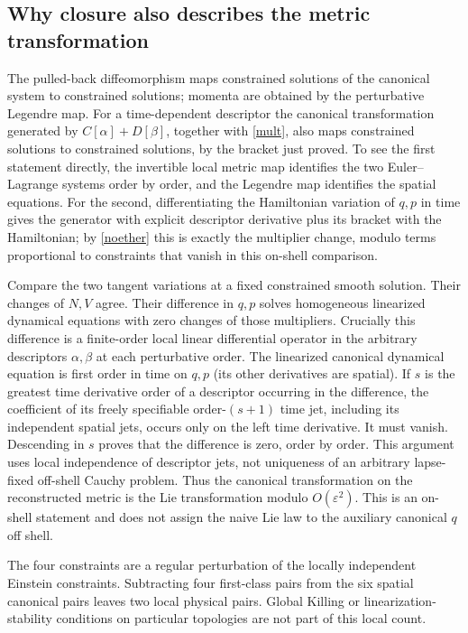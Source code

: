 \documentclass[11pt]{article}
\newcommand{\ep}{\varepsilon}
\begin{document}
\subsection{Why closure also describes the metric transformation}
The pulled-back diffeomorphism maps constrained solutions of the canonical system to constrained solutions; momenta are obtained by the perturbative Legendre map. For a time-dependent descriptor the canonical transformation generated by \(C[\alpha]+D[\beta]\), together with \eqref{mult}, also maps constrained solutions to constrained solutions, by the bracket just proved. To see the first statement directly, the invertible local metric map identifies the two Euler--Lagrange systems order by order, and the Legendre map identifies the spatial equations. For the second, differentiating the Hamiltonian variation of \(q,p\) in time gives the generator with explicit descriptor derivative plus its bracket with the Hamiltonian; by \eqref{noether} this is exactly the multiplier change, modulo terms proportional to constraints that vanish in this on-shell comparison.

Compare the two tangent variations at a fixed constrained smooth solution. Their changes of \(N,V\) agree. Their difference in \(q,p\) solves homogeneous linearized dynamical equations with zero changes of those multipliers. Crucially this difference is a finite-order local linear differential operator in the arbitrary descriptors \(\alpha,\beta\) at each perturbative order. The linearized canonical dynamical equation is first order in time on \(q,p\) (its other derivatives are spatial). If \(s\) is the greatest time derivative order of a descriptor occurring in the difference, the coefficient of its freely specifiable order-\((s+1)\) time jet, including its independent spatial jets, occurs only on the left time derivative. It must vanish. Descending in \(s\) proves that the difference is zero, order by order. This argument uses local independence of descriptor jets, not uniqueness of an arbitrary lapse-fixed off-shell Cauchy problem. Thus the canonical transformation on the reconstructed metric is the Lie transformation modulo \(O(\ep^2)\). This is an on-shell statement and does not assign the naive Lie law to the auxiliary canonical \(q\) off shell.

The four constraints are a regular perturbation of the locally independent Einstein constraints. Subtracting four first-class pairs from the six spatial canonical pairs leaves two local physical pairs. Global Killing or linearization-stability conditions on particular topologies are not part of this local count.
\end{document}
